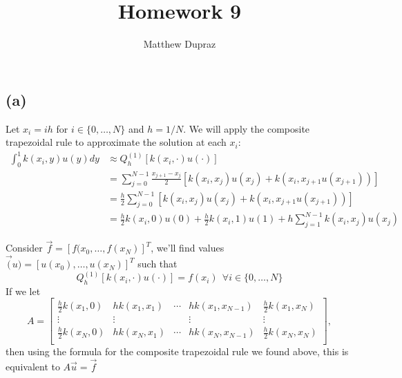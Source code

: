 \documentclass{article}
\title{Homework 9}
\author{Matthew Dupraz}
\begin{document}
\maketitle

\subsection*{(a)}

Let $x_i = ih$ for $i \in \{0, \dots, N\}$ and $h = 1/N$.
We will apply the composite trapezoidal rule to approximate
the solution at each $x_i$:
\begin{align*}
	\int_0^1 k(x_i, y)u(y) dy &\approx
	Q^{(1)}_h[k(x_i, \cdot)u(\cdot)]\\
	&= \sum_{j=0}^{N-1}\frac{x_{j+1} - x_j}{2}[
	k(x_i, x_j)u(x_j) + k(x_i, x_{j+1}u(x_{j+1}))]\\
	&= \frac{h}{2}\sum_{j=0}^{N-1}[
	k(x_i, x_j)u(x_j) + k(x_i, x_{j+1}u(x_{j+1}))]\\
	&= \frac{h}{2}k(x_i, 0)u(0) + \frac{h}{2}k(x_i,1)u(1)
	+ h\sum_{j=1}^{N-1}k(x_i, x_j)u(x_j)
\end{align*}

Consider $\vec{f} = [f(x_0, \dots, f(x_N)]^T$, we'll find values
$\vec(u) = [u(x_0), \dots, u(x_N)]^T$ such that
\begin{equation*}
	Q_h^{(1)}[k(x_i, \cdot)u(\cdot)] = f(x_i) ~~
	\forall i \in \{0, \dots, N\}
\end{equation*}
If we let
\begin{equation*}
	A = \begin{bmatrix}
		\frac{h}{2}k(x_1, 0) & hk(x_1, x_1) & \cdots &
		hk(x_1, x_{N-1}) & \frac{h}{2} k(x_1, x_N)\\
		\vdots & \vdots & & \vdots & \vdots\\
		\frac{h}{2}k(x_N, 0) & hk(x_N, x_1) & \cdots &
		hk(x_N, x_{N-1}) & \frac{h}{2} k(x_N, x_N)\\
	\end{bmatrix},
\end{equation*}
then using the formula for the composite trapezoidal rule we found
above, this is equivalent to $A\vec{u} = \vec{f}$
\end{document}
